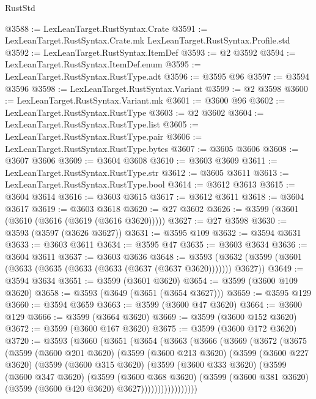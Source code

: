 \begin{lexlean}{RustStd}
\begin{coremodule}
@3588 := LexLeanTarget.RustSyntax.Crate
@3591 := LexLeanTarget.RustSyntax.Crate.mk LexLeanTarget.RustSyntax.Profile.std
@3592 := LexLeanTarget.RustSyntax.ItemDef
@3593 := @2 @3592
@3594 := LexLeanTarget.RustSyntax.ItemDef.enum
@3595 := LexLeanTarget.RustSyntax.RustType.adt
@3596 := @3595 @96
@3597 := @3594 @3596
@3598 := LexLeanTarget.RustSyntax.Variant
@3599 := @2 @3598
@3600 := LexLeanTarget.RustSyntax.Variant.mk
@3601 := @3600 @96
@3602 := LexLeanTarget.RustSyntax.RustType
@3603 := @2 @3602
@3604 := LexLeanTarget.RustSyntax.RustType.list
@3605 := LexLeanTarget.RustSyntax.RustType.pair
@3606 := LexLeanTarget.RustSyntax.RustType.bytes
@3607 := @3605 @3606
@3608 := @3607 @3606
@3609 := @3604 @3608
@3610 := @3603 @3609
@3611 := LexLeanTarget.RustSyntax.RustType.str
@3612 := @3605 @3611
@3613 := LexLeanTarget.RustSyntax.RustType.bool
@3614 := @3612 @3613
@3615 := @3604 @3614
@3616 := @3603 @3615
@3617 := @3612 @3611
@3618 := @3604 @3617
@3619 := @3603 @3618
@3620 := @27 @3602
@3626 := @3599 (@3601 (@3610 (@3616 (@3619 (@3616 @3620)))))
@3627 := @27 @3598
@3630 := @3593 (@3597 (@3626 @3627))
@3631 := @3595 @109
@3632 := @3594 @3631
@3633 := @3603 @3611
@3634 := @3595 @47
@3635 := @3603 @3634
@3636 := @3604 @3611
@3637 := @3603 @3636
@3648 := @3593 (@3632 (@3599 (@3601 (@3633 (@3635 (@3633 (@3633 (@3637 (@3637 @3620))))))) @3627))
@3649 := @3594 @3634
@3651 := @3599 (@3601 @3620)
@3654 := @3599 (@3600 @109 @3620)
@3658 := @3593 (@3649 (@3651 (@3654 @3627)))
@3659 := @3595 @129
@3660 := @3594 @3659
@3663 := @3599 (@3600 @47 @3620)
@3664 := @3600 @129
@3666 := @3599 (@3664 @3620)
@3669 := @3599 (@3600 @152 @3620)
@3672 := @3599 (@3600 @167 @3620)
@3675 := @3599 (@3600 @172 @3620)
@3720 := @3593
    (@3660
      (@3651
        (@3654
          (@3663
            (@3666
              (@3669
                (@3672
                  (@3675
                    (@3599
                      (@3600 @201 @3620)
                      (@3599
                        (@3600 @213 @3620)
                        (@3599
                          (@3600 @227 @3620)
                          (@3599
                            (@3600 @315 @3620)
                            (@3599
                              (@3600 @333 @3620)
                              (@3599
                                (@3600 @347 @3620)
                                (@3599
                                  (@3600 @368 @3620)
                                  (@3599
                                    (@3600 @381 @3620)
                                    (@3599 (@3600 @420 @3620) @3627)))))))))))))))))

\end{coremodule}
\end{lexlean}
